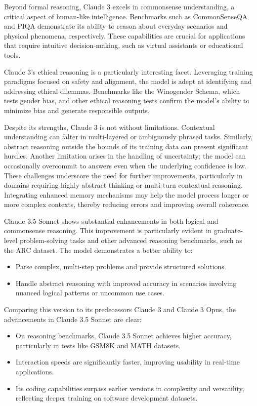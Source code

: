 Beyond formal reasoning, Claude 3 excels in commonsense understanding, a critical aspect of human-like intelligence.
Benchmarks such as CommonSenseQA and PIQA demonstrate its ability to reason about everyday scenarios and physical phenomena, respectively.
These capabilities are crucial for applications that require intuitive decision-making, such as virtual assistants or educational tools.

Claude 3's ethical reasoning is a particularly interesting facet.
Leveraging training paradigms focused on safety and alignment, the model is adept at identifying and addressing ethical dilemmas.
Benchmarks like the Winogender Schema, which tests gender bias, and other ethical reasoning tests confirm the model's ability to minimize bias and generate responsible outputs.

Despite its strengths, Claude 3 is not without limitations.
Contextual understanding can falter in multi-layered or ambiguously phrased tasks.
Similarly, abstract reasoning outside the bounds of its training data can present significant hurdles.
Another limitation arises in the handling of uncertainty; the model can occasionally overcommit to answers even when the underlying confidence is low.
These challenges underscore the need for further improvements, particularly in domains requiring highly abstract thinking or multi-turn contextual reasoning.
Integrating enhanced memory mechanisms may help the model process longer or more complex contexts, thereby reducing errors and improving overall coherence.

Claude 3.5 Sonnet shows substantial enhancements in both logical and commonsense reasoning.
This improvement is particularly evident in graduate-level problem-solving tasks and other advanced reasoning benchmarks, such as the ARC dataset.
The model demonstrates a better ability to:
\begin{itemize}
	\item Parse complex, multi-step problems and provide structured solutions.
	\item Handle abstract reasoning with improved accuracy in scenarios involving nuanced logical patterns or uncommon use cases.
\end{itemize}
Comparing this version to its predecessors Claude 3 and Claude 3 Opus, the advancements in Claude 3.5 Sonnet are clear:
\begin{itemize}
	\item On reasoning benchmarks, Claude 3.5 Sonnet achieves higher accuracy, particularly in tests like GSM8K and MATH datasets.
	\item Interaction speeds are significantly faster, improving usability in real-time applications.
	\item Its coding capabilities surpass earlier versions in complexity and versatility, reflecting deeper training on software development datasets.
\end{itemize}

